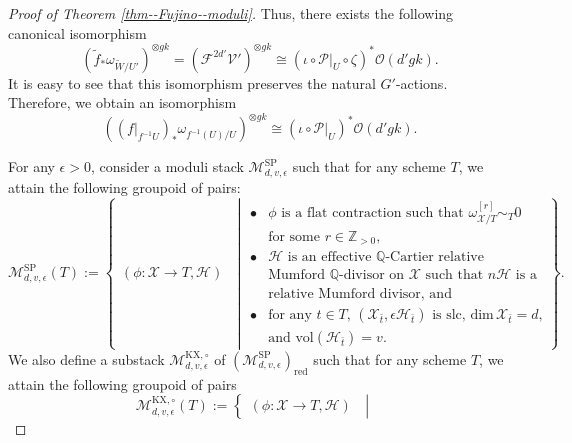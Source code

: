 \documentclass[12pt,twoside]{amsart}
\theoremstyle{definition}
\begin{document}
\begin{proof}[Proof of Theorem \ref{thm--Fujino--moduli}]
Thus, there exists the following canonical isomorphism 
\begin{equation*}
(\tilde{f}_*\omega_{\widetilde{W}/U'})^{\otimes gk}=(\mathscr{F}^{2d'}\mathscr{V}')^{\otimes gk}\cong (\iota\circ\mathcal{P}|_{U}\circ\zeta)^*\mathcal{O}(d'gk).
\end{equation*}
It is easy to see that this isomorphism preserves the natural $G'$-actions.
Therefore, we obtain an isomorphism
\begin{equation*}\tag{$\star$}\label{eq--moduli--hodge-1}
((f|_{f^{-1}U})_*\omega_{f^{-1}(U)/U})^{\otimes gk}\cong (\iota\circ\mathcal{P}|_{U})^*\mathcal{O}(d'gk).
\end{equation*}




For any $\epsilon>0$, consider a moduli stack $\mathcal{M}^{\mathrm{SP}}_{d,v,\epsilon}$ such that for any scheme $T$, we attain the following groupoid of pairs: 
\[
    \mathcal{M}^{\mathrm{SP}}_{d,v,\epsilon}(T):=
    \left\{\begin{array}{l}
(\phi\colon\mathcal{X}\to T,\mathcal{H})
\end{array}
\;\middle|
\begin{array}{rl}
\bullet\!\!&\text{$\phi$ is a flat contraction such that $\omega_{\mathcal{X}/T}^{[r]}\sim_T 0$}\\
&\text{for some $r\in\mathbb{Z}_{>0}$,}\\
\bullet\!\!&\text{$\mathcal{H}$ is an effective $\mathbb{Q}$-Cartier relative}\\ 
&\text{Mumford $\mathbb{Q}$-divisor on $\mathcal{X}$ such that $n\mathcal{H}$ is a}\\ 
&\text{relative Mumford divisor, and}\\ 
\bullet\!\!&\text{for any $t\in T$, $(\mathcal{X}_{\bar{t}},\epsilon\mathcal{H}_{\bar{t}})$ is slc, $\mathrm{dim}\, \mathcal{X}_{\bar{t}} = d$,}\\
&\text{and $\mathrm{vol}(\mathcal{H}_{\bar{t}})=v$.}
\end{array}\right\}.
    \]
    We also define a substack $\mathcal{M}^{\mathrm{KX},\circ}_{d,v,\epsilon}$ of $(\mathcal{M}^{\mathrm{SP}}_{d,v,\epsilon})_{\mathrm{red}}$ such that for any scheme $T$, we attain the following groupoid of pairs
     \[
    \mathcal{M}^{\mathrm{KX},\circ}_{d,v,\epsilon}(T):=
    \left\{\begin{array}{l}
(\phi\colon\mathcal{X}\to T,\mathcal{H})
\end{array}
\;\middle|
\begin{array}{rl}

\end{array}\]
\end{proof}
\end{document}
